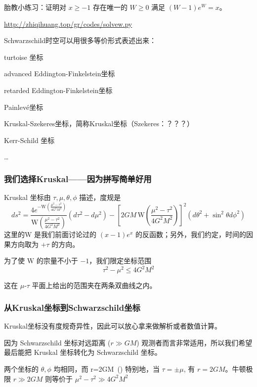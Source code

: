 \documentclass[CJK,13pt]{beamer}
\date{}
\begin{document}
  \bch

  \begin{frame}
    胎教小练习：证明对 $x\ge -1$ 存在唯一的 $W\ge 0$ 满足 $(W-1)e^W = x$。

    
    \url{http://zhiqihuang.top/gr/codes/solvew.py}
    
  \end{frame}


  \begin{frame}
    
    Schwarzschild时空可以用很多等价形式表述出来：
    
    \bitem
    \item{turtoise 坐标}
    \item{advanced Eddington-Finkelstein坐标}

    \item{retarded Eddington-Finkelstein坐标}

    \item{Painlev\'{e}坐标}
      
    \item{Kruskal-Szekeres坐标，简称Kruskal坐标（Szekeres：？？？）}
    \item{Kerr-Schild 坐标}
    \item{\ldots}
      \eitem

  \end{frame}
  

  \begin{frame}
    \frametitle{我们选择Kruskal——因为\sout{拼写简单}好用}

    Kruskal 坐标由 $\tau,\mu,\theta,\phi$ 描述，度规是
    {\blue \small $$ ds^2 = \frac{4e^{-\mathrm{W}\left(\frac{\mu^2-\tau^2}{4G^2M^2}\right)}}{\mathrm{W}\left(\frac{\mu^2-\tau^2}{4G^2M^2}\right)} \left(d\tau^2-d\mu^2\right) - \left[2GM\, \mathrm{W}\left(\frac{\mu^2-\tau^2}{4G^2M^2}\right)\right]^2\left(d\theta^2 + \sin^2\theta d\phi^2\right)$$}
    这里的$\mathrm{W}$ 是我们前面讨论过的 $(x-1)e^x$ 的反函数；另外，我们约定，{\blue 时间的因果方向取为 $+\tau$ 的方向。}

    为了使 $\mathrm{W}$ 的宗量不小于 $-1$，我们限定坐标范围
    $$ \tau^2-\mu^2 \le 4G^2M^2$$

    这在 $\mu$-$\tau$ 平面上给出的范围夹在两条双曲线之内。
    
  \end{frame}

  \begin{frame}
    \frametitle{从Kruskal坐标到Schwarzschild坐标}
    Kruskal坐标没有度规奇异性，因此可以放心拿来做解析或者数值计算。
    
    因为 Schwarzschild 坐标对远距离 ($r\gg GM$) 观测者而言非常适用，所以我们希望最后能把 Kruskal 坐标转化为 Schwarzschild 坐标。

    两个坐标的 $\theta,\phi$ 均相同，而 {\blue
    \be
    r=2GM\, \left(\right)
    \ee}
    特别地，当 $\tau=\pm \mu$, 有 $r=2GM$。牛顿极限 $r\gg 2GM$ 则等价于 $\mu^2-\tau^2 \gg 4G^2M^2$
  \end{frame}
\end{document}
